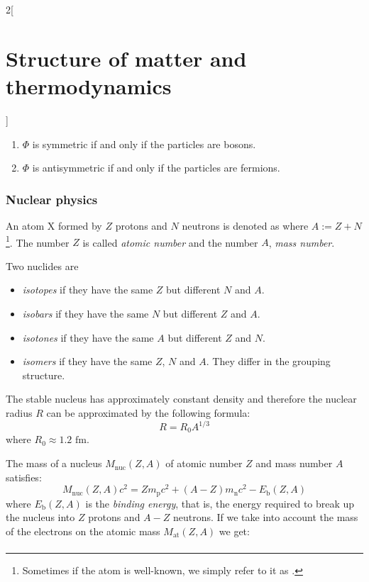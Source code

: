 \documentclass[../../../main.tex]{subfiles}
\begin{document}
\begin{multicols}{2}[\section{Structure of matter and thermodynamics}]
\begin{prop}
    \begin{enumerate}
      \item $\Phi$ is symmetric if and only if the particles are bosons.
      \item $\Phi$ is antisymmetric if and only if the particles are fermions.
    \end{enumerate}
  \end{prop}
  \subsubsection{Nuclear physics}
  \begin{definition}[Atom]
    An atom X formed by $Z$ protons and $N$ neutrons is denoted as  where $A:=Z+N$\footnote{Sometimes if the atom  is well-known, we simply refer to it as .}. The number $Z$ is called \textit{atomic number} and the number $A$, \textit{mass number}.
  \end{definition}
  \begin{definition}
    Two nuclides are
    \begin{itemize}
      \item \textit{isotopes} if they have the same $Z$ but different $N$ and $A$.
      \item \textit{isobars} if they have the same $N$ but different $Z$ and $A$.
      \item \textit{isotones} if they have the same $A$ but different $Z$ and $N$.
      \item \textit{isomers} if they have the same $Z$, $N$ and $A$. They differ in the grouping structure.
    \end{itemize}
  \end{definition}
  \begin{prop}
    The stable nucleus has approximately constant density and therefore the nuclear radius $R$ can be approximated by the following formula:
    $$R=R_0A^{1/3}$$ where $R_0\approx1.2\text{ fm}$.
  \end{prop}
  \begin{prop}
    The mass of a nucleus $M_\text{nuc}(Z,A)$ of atomic number $Z$ and mass number $A$ satisfies:
    $$M_\text{nuc}(Z,A)c^2=Zm_\text{p}c^2+(A-Z)m_\text{n}c^2-E_\text{b}(Z,A)$$ where $E_\text{b}(Z,A)$ is the \textit{binding energy}, that is, the energy required to break up the nucleus into $Z$ protons and $A-Z$ neutrons. If we take into account the mass of the electrons on the atomic mass $M_\text{at}(Z,A)$ we get:
    \begin{multline*}

\end{multline*}
\end{prop}
\end{multicols}
\end{document}

